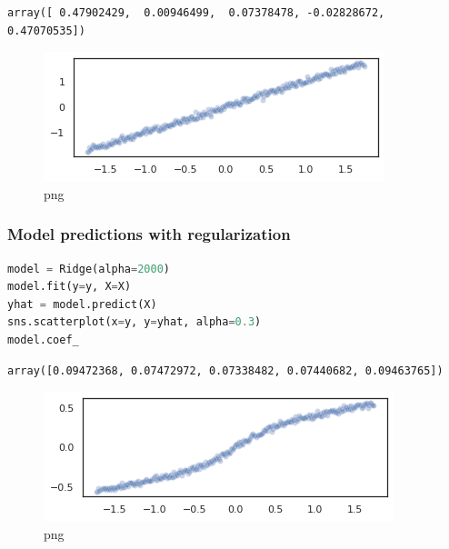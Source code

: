 \begin{lstlisting}
array([ 0.47902429,  0.00946499,  0.07378478, -0.02828672,  0.47070535])
\end{lstlisting}

\begin{figure}
\centering
\includegraphics{fig/normality_and_linearity_violation_files/normality_and_linearity_violation_5_1.png}
\caption{png}
\end{figure}

\hypertarget{model-predictions-with-regularization}{%
\subsubsection{\texorpdfstring{Model predictions \textbf{with}
regularization}{Model predictions with regularization}}\label{model-predictions-with-regularization}}

\begin{lstlisting}[language=Python]
model = Ridge(alpha=2000)
model.fit(y=y, X=X)
yhat = model.predict(X)
sns.scatterplot(x=y, y=yhat, alpha=0.3)
model.coef_

\end{lstlisting}

\begin{lstlisting}
array([0.09472368, 0.07472972, 0.07338482, 0.07440682, 0.09463765])
\end{lstlisting}

\begin{figure}
\centering
\includegraphics{fig/normality_and_linearity_violation_files/normality_and_linearity_violation_7_1.png}
\caption{png}
\end{figure}
